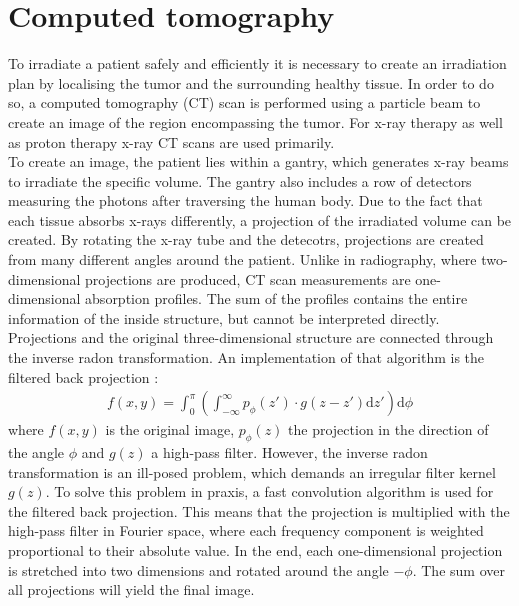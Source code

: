 \section{Computed tomography} \label{sec:ct}
To irradiate a patient safely and efficiently it is necessary to create an irradiation plan by localising the tumor and the surrounding healthy tissue. In order to do so, a computed
tomography (CT) scan is performed using a particle beam to create an image of the region encompassing the tumor. For x-ray therapy as well as proton therapy x-ray CT scans
are used primarily. \\
To create an image, the patient lies within a gantry, which generates x-ray beams to irradiate the specific volume. The gantry also
includes a row of detectors measuring the photons after traversing the human body. Due to the fact that each tissue absorbs
x-rays differently, a projection of the irradiated volume can be created. By rotating the x-ray tube and the detecotrs, projections are created from many different angles around the patient.
Unlike in radiography, where two-dimensional projections are produced, CT scan measurements are one-dimensional absorption profiles. The sum of the profiles contains
the entire information of the inside structure, but cannot be interpreted directly. Projections and the original three-dimensional structure are connected through
the inverse radon transformation. An implementation of that algorithm is the filtered back projection \cite{back_projection}:
\begin{align}
  f(x,y) = \int_0^{\pi} \left(\int_{-\infty}^{\infty} p_{\phi}(z') \cdot g(z - z') \mathrm{d}z'\right) \mathrm{d}\phi
\end{align}
where $f(x,y)$ is the original image, $p_{\phi}(z)$ the projection in the direction of the angle $\phi$ and $g(z)$ a high-pass filter. However, the inverse
radon transformation is an ill-posed problem, which demands an irregular filter kernel $g(z)$. To solve this problem in praxis, a fast convolution algorithm is used for the
filtered back projection. This means that the projection is multiplied with the high-pass filter in Fourier space, where each frequency component is weighted proportional to their
absolute value. In the end, each one-dimensional projection is stretched into two dimensions and rotated around the angle $-\phi$. The sum over all projections will yield the
final image.



